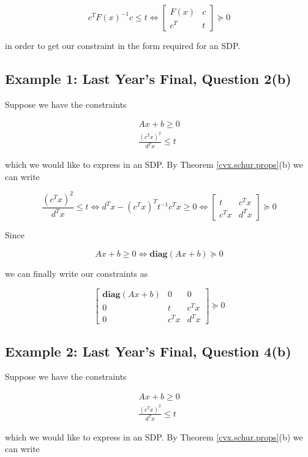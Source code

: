 \[
c^TF(x)^{-1}c  \leq t \iff  \begin{bmatrix}
    F(x)      & c \\
    c^T & t
\end{bmatrix} \succeq 0 
\]

in order to get our constraint in the form required for an SDP.

\subsection{Example 1: Last Year's Final, Question 2(b)}

Suppose we have the constraints

\[
\begin{aligned}
Ax + b \geq 0 \\
\frac{(c^Tx)^2}{d^Tx} \leq t
\end{aligned}
\]

which we would like to express in an SDP. By Theorem \ref{cvx.schur.props}(b) we can write

\[
\frac{(c^Tx)^2}{d^Tx} \leq t \iff d^Tx - (c^Tx)^T t^{-1} c^Tx \geq 0  \iff  \begin{bmatrix}
    t      & c^Tx \\
    c^Tx & d^Tx
\end{bmatrix} \succeq 0 
\]

Since

\[
Ax + b \geq 0 \iff \textbf{diag}(Ax + b) \succeq 0
\]

we can finally write our constraints as 

\[
\begin{bmatrix}
    \textbf{diag}(Ax + b) & 0 & 0 \\
    0 & t      & c^Tx \\
    0 & c^Tx & d^Tx
\end{bmatrix} \succeq 0 
\]

\subsection{Example 2: Last Year's Final, Question 4(b)}

Suppose we have the constraints

\[
\begin{aligned}
Ax + b \geq 0 \\
\frac{(c^Tx)^2}{d^Tx} \leq t
\end{aligned}
\]

which we would like to express in an SDP. By Theorem \ref{cvx.schur.props}(b) we can write

